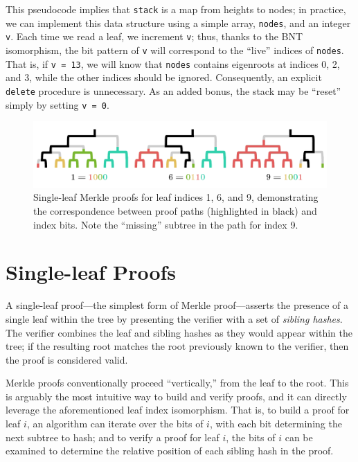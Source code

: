 \documentclass[twocolumn]{article}
\begin{document}
\pagebreak

This pseudocode implies that \verb`stack` is a map from heights to nodes; in practice, we can implement this data structure using a simple array, \verb`nodes`, and an integer \verb`v`. Each time we read a leaf, we increment \verb`v`; thus, thanks to the BNT isomorphism, the bit pattern of \verb`v` will correspond to the ``live'' indices of \verb`nodes`. That is, if \verb`v = 13`, we will know that \verb`nodes` contains eigenroots at indices 0, 2, and 3, while the other indices should be ignored. Consequently, an explicit \verb`delete` procedure is unnecessary. As an added bonus, the stack may be ``reset'' simply by setting \verb`v = 0`.



\begin{figure}[t]
\includegraphics[scale=0.24]{paths}
\centering
\caption{Single-leaf Merkle proofs for leaf indices 1, 6, and 9, demonstrating the correspondence between proof paths (highlighted in black) and index bits. Note the ``missing'' subtree in the path for index 9.}
\label{img-path}
\end{figure}

\section{Single-leaf Proofs}

A single-leaf proof---the simplest form of Merkle proof---asserts the presence of a single leaf within the tree by presenting the verifier with a set of \textit{sibling hashes}. The verifier combines the leaf and sibling hashes as they would appear within the tree; if the resulting root matches the root previously known to the verifier, then the proof is considered valid.


Merkle proofs conventionally proceed ``vertically,'' from the leaf to the root. This is arguably the most intuitive way to build and verify proofs, and it can directly leverage the aforementioned leaf index isomorphism. That is, to build a proof for leaf $i$, an algorithm can iterate over the bits of $i$, with each bit determining the next subtree to hash; and to verify a proof for leaf $i$, the bits of $i$ can be examined to determine the relative position of each sibling hash in the proof.
\end{document}
